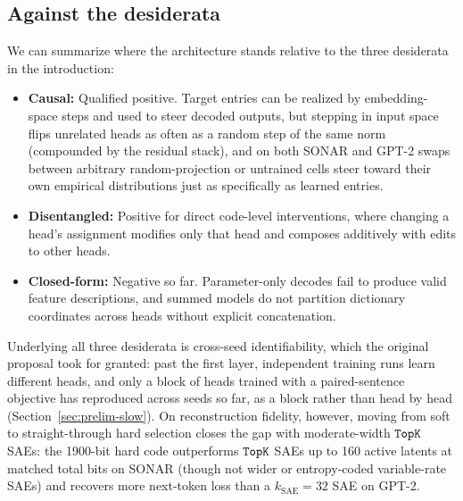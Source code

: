 \subsection{Against the desiderata}
We can summarize where the architecture stands relative to the three
desiderata in the introduction:
\begin{itemize}
	\item \textbf{Causal:} Qualified positive. Target entries can be
	realized by embedding-space steps and used to steer decoded outputs,
	but stepping in input space flips unrelated heads as often as a
	random step of the same norm (compounded by the residual stack), and
	on both SONAR and GPT-2 swaps between arbitrary random-projection or
	untrained cells steer toward their own empirical distributions just
	as specifically as learned entries.
	\item \textbf{Disentangled:} Positive for direct code-level
	interventions, where changing a head's assignment modifies only that
	head and composes additively with edits to other heads.
	\item \textbf{Closed-form:} Negative so far. Parameter-only decodes
	fail to produce valid feature descriptions, and summed models do not
	partition dictionary coordinates across heads without explicit
	concatenation.
\end{itemize}
Underlying all three desiderata is cross-seed identifiability, which the
original proposal took for granted: past the first layer, independent
training runs learn different heads, and only a block of heads trained
with a paired-sentence objective has reproduced across seeds so far, as
a block rather than head by head (Section~\ref{sec:prelim-slow}). On reconstruction fidelity, however,
moving from soft to straight-through hard selection closes the gap with
moderate-width $\mathop{\mathtt{TopK}}\limits$ SAEs: the 1900-bit hard code outperforms $\mathop{\mathtt{TopK}}\limits$
SAEs up to 160 active latents at matched total bits on SONAR (though not
wider or entropy-coded variable-rate SAEs) and recovers more next-token
loss than a $k_{\mathrm{SAE}}{=}32$ SAE on GPT-2.
